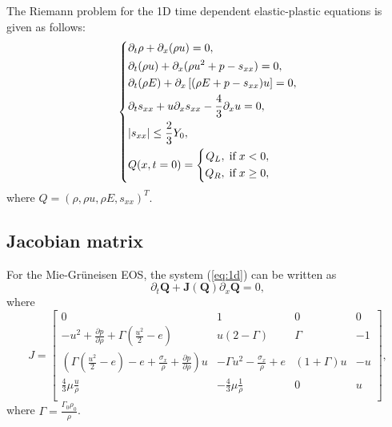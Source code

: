 \documentclass[review]{elsarticle}
\begin{document}
The Riemann problem for the 1D time dependent elastic-plastic equations is given as follows:
 \begin{equation}\label{eq:1d}
   \left\{ \begin{aligned}
       & \partial _t \rho +\partial_x(\rho u)=0,\\
       & \partial _t (\rho u)+\partial_x(\rho u^2 + p -s_{xx})=0,\\
       &\partial _t (\rho E)+\partial_x\left[(\rho E + p -s_{xx})u\right]=0,\\
       &\partial _t s_{xx}+u\partial_xs_{xx}-\frac{4}{3}\partial_x u=0,\\
& |s_{xx}|\leq \frac{2}{3}Y_{0}, \\
       &Q(x,t = 0) = \left\{\begin{aligned}
           Q_L, \hspace{0.1cm} \text{if} \hspace{0.1cm} x<0, \\
           Q_R, \hspace{0.1cm} \text{if} \hspace{0.1cm} x\ge 0, \\
       \end{aligned}\right.
     \end{aligned}
  \right.
\end{equation}
where $Q = (\rho, \rho u, \rho E, s_{xx})^T$.

\subsection{Jacobian matrix} %
For the Mie-Gr\"uneisen EOS, the system (\ref{eq:1d}) can be written as
\begin{equation}
 \partial_t \mathbf{Q} +\mathbf{J}(\mathbf{{Q}})\partial_x\mathbf{Q} = 0,
\end{equation}
where
\begin{equation}\label{eq:Jcb}
  J = \left[\begin{array}{llll}
      0 & 1 & 0 & 0 \\
      -u^2 + \frac{\partial p}{\partial \rho} +\Gamma(\frac{u^2}{2}-e)& u(2-\Gamma)& \Gamma & -1 \\
      (\Gamma(\frac{u^2}{2}-e)-e+\frac{\sigma_x}{\rho}+\frac{\partial p}{\partial \rho})u & -\Gamma u^2 -\frac{\sigma_x}{\rho} +e & (1+\Gamma)u& -u\\
    \frac{4}{3}\mu\frac{u}{\rho} & -\frac{4}{3}\mu\frac{1}{\rho}& 0 & u \\
\end{array}
\right],
\end{equation}
where $\Gamma = \frac{\Gamma_0\rho_0}{\rho} $.
\end{document}
